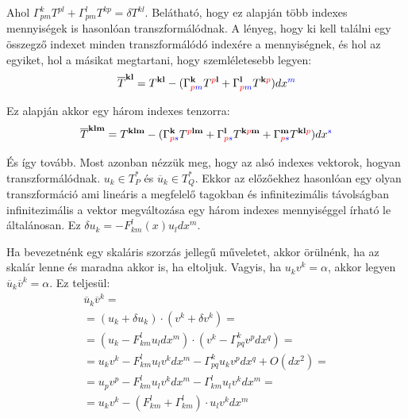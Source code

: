 \documentclass[a4paper,12pt]{article}
\begin{document}
\par Ahol $\Gamma_{pm}^{k}T^{pl} + \Gamma_{pm}^{l}T^{kp} = \delta T^{kl}$. Belátható, hogy ez alapján több indexes mennyiségek is hasonlóan transzformálódnak. A lényeg, hogy ki kell találni egy összegző indexet minden transzformálódó indexére a mennyiségnek, és hol az egyiket, hol a másikat megtartani, hogy szemléletesebb legyen:
\begin{equation*}
    \overline{T}^{\textbf{kl}} = T^{\textbf{kl}} - (\Gamma_{\textcolor{red}{p}\textcolor{blue}{m}}^{\textbf{k}}T^{\textcolor{red}{p}\textbf{l}} + \Gamma_{\textcolor{red}{p}\textcolor{blue}{m}}^{\textbf{l}}T^{\textbf{k}\textcolor{red}{p}})dx^{\textcolor{blue}{m}}
\end{equation*}
\par Ez alapján akkor egy három indexes tenzorra:
\begin{equation*}
    \overline{T}^{\textbf{klm}} = T^{\textbf{klm}} - (\Gamma_{\textcolor{red}{p}\textcolor{blue}{s}}^{\textbf{k}}T^{\textcolor{red}{p}\textbf{lm}} + \Gamma_{\textcolor{red}{p}\textcolor{blue}{s}}^{\textbf{l}}T^{\textbf{k}\textcolor{red}{p}\textbf{m}} + \Gamma_{\textcolor{red}{p}\textcolor{blue}{s}}^{\textbf{m}}T^{\textbf{kl}\textcolor{red}{p}})dx^{\textcolor{blue}{s}}
\end{equation*}
\par És így tovább. Most azonban nézzük meg, hogy az alsó indexes vektorok, hogyan transzformálódnak. $u_{k} \in T_{P}^{*}$ és $\overline{u}_{k} \in T_{Q}^{*}$. Ekkor az előzőekhez hasonlóan egy olyan transzformáció ami lineáris a megfelelő tagokban és infinitezimális távolságban infinitezimális a vektor megváltozása egy három indexes mennyiséggel írható le általánosan. Ez $\delta u_{k} = -F^{l}_{km}(x)u_{l}dx^{m}$.
\par Ha bevezetnénk egy skaláris szorzás jellegű műveletet, akkor örülnénk, ha az skalár lenne és maradna akkor is, ha eltoljuk. Vagyis, ha $u_{k}v^{k} = \alpha$, akkor legyen $\overline{u}_{k}\overline{v}^{k} = \alpha$. Ez teljesül:
\begin{align*}
    \overline{u}_{k}\overline{v}^{k} = \\
    = (u_{k} + \delta u_{k})\cdot(v^{k} + \delta v^{k}) = \\
    = (u_{k} - F^{l}_{km}u_{l}dx^{m})\cdot(v^{k} - \Gamma_{pq}^{k}v^{p}dx^{q}) = \\
    = u_{k}v^{k} - F_{km}^{l}u_{l}v^{k}dx^{m} - \Gamma_{pq}^{k}u_{k}v^{p}dx^{q} + O(dx^{2}) = \\
    = u_{p}v^{p} - F_{km}^{l}u_{l}v^{k}dx^{m} - \Gamma_{km}^{l}u_{l}v^{k}dx^{m} = \\
    = u_{k}v^{k} - (F_{km}^{l} + \Gamma_{km}^{l})\cdot u_{l}v^{k}dx^{m} 
\end{align*}
\end{document}
